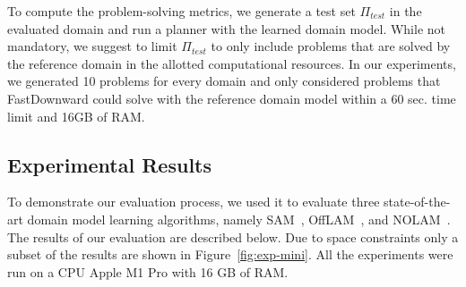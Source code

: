 \documentclass{article}
\theoremstyle{definition}
\theoremstyle{remark}
\newcommand{\stest}{\ensuremath{S_{\textit{test}}}\xspace}
\newcommand{\ptest}{\ensuremath{\Pi_{\textit{test}}}\xspace}
\newcommand{\nolam}{NOLAM\xspace}
\newcommand{\offlam}{OffLAM\xspace}
\newcommand{\T}{T}
\newcommand{\Ttrain}{\T_{train}}
\newcommand{\Ttest}{\T_{test}}
\newcommand{\samshort}{SAM}
\newif\ifaddcomments
\newcommand{\roni}[1]{\ifaddcomments{\textcolor{red}{[Roni: #1]}}\fi}
\newcommand{\leo}[1]{\ifaddcomments{\textcolor{pink}{[Leonardo: #1]}}\fi}
\begin{document}
%
To compute the problem-solving metrics, we generate a test set \ptest in the evaluated domain and run a planner with the learned domain model. 
While not mandatory, we suggest to limit \ptest to only include problems that are solved by the reference domain in the allotted computational resources. 
In our experiments, we generated 10 problems for every domain and only considered problems that FastDownward could solve with the reference domain model within a 60 sec. time limit and 16GB of RAM. %





%


\subsection{Experimental Results}



To demonstrate our evaluation process, we used it to evaluate three state-of-the-art domain model learning algorithms, namely \samshort~\citep{juba2021safe}, \offlam~\citep{LAMANNA2025104256}, and \nolam~\citep{Lamanna24}. The results of our evaluation  are described below. Due to space constraints only a subset of the results are shown in Figure~\ref{fig:exp-mini}. All the experiments were run on a CPU Apple M1 Pro with 16 GB of RAM.
\end{document}
